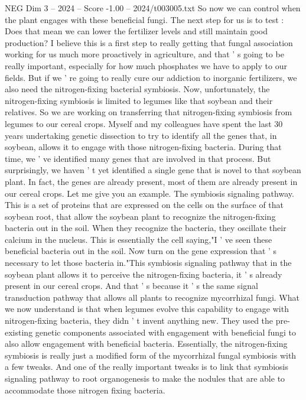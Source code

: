 \begin{textsample}{NEG Dim 3 – 2024 – Score -1.00 – 2024/t003005.txt}
So now we can control when the plant engages with these beneficial fungi.
The next step for us is to test : Does that mean we can lower the fertilizer levels and still maintain good production?
I believe this is a first step to really getting that fungal association working for us much more proactively in agriculture, and that ' s going to be really important, especially for how much phosphates we have to apply to our fields.
But if we ' re going to really cure our addiction to inorganic fertilizers, we also need the nitrogen-fixing bacterial symbiosis.
Now, unfortunately, the nitrogen-fixing symbiosis is limited to legumes like that soybean and their relatives.
So we are working on transferring that nitrogen-fixing symbiosis from legumes to our cereal crops.
Myself and my colleagues have spent the last 30 years undertaking genetic dissection to try to identify all the genes that, in soybean, allows it to engage with those nitrogen-fixing bacteria.
During that time, we ' ve identified many genes that are involved in that process.
But surprisingly, we haven ' t yet identified a single gene that is novel to that soybean plant.
In fact, the genes are already present, most of them are already present in our cereal crops.
Let me give you an example.
The symbiosis signaling pathway.
This is a set of proteins that are expressed on the cells on the surface of that soybean root, that allow the soybean plant to recognize the nitrogen-fixing bacteria out in the soil.
When they recognize the bacteria, they oscillate their calcium in the nucleus.
This is essentially the cell saying,"I ' ve seen these beneficial bacteria out in the soil.
Now turn on the gene expression that ' s necessary to let those bacteria in."This symbiosis signaling pathway that in the soybean plant allows it to perceive the nitrogen-fixing bacteria, it ' s already present in our cereal crops.
And that ' s because it ' s the same signal transduction pathway that allows all plants to recognize mycorrhizal fungi.
What we now understand is that when legumes evolve this capability to engage with nitrogen-fixing bacteria, they didn ' t invent anything new.
They used the pre-existing genetic components associated with engagement with beneficial fungi to also allow engagement with beneficial bacteria.
Essentially, the nitrogen-fixing symbiosis is really just a modified form of the mycorrhizal fungal symbiosis with a few tweaks.
And one of the really important tweaks is to link that symbiosis signaling pathway to root organogenesis to make the nodules that are able to accommodate those nitrogen fixing bacteria.

\end{textsample}
